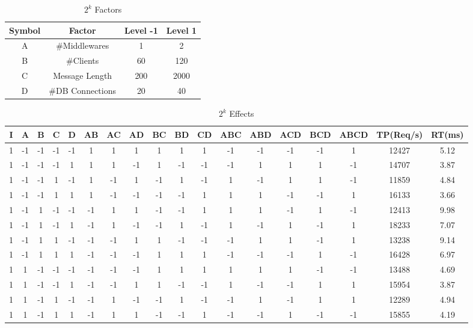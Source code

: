 \documentclass[11pt]{article}
\begin{document}
\begin{landscape}
\begin{table}
\small
\centering
\caption{$2^k$ Factors}
\label{tbl:2k_labels}
\begin{tabular}{cccc}
	Symbol & Factor & Level -1 & Level 1 \\ \hline
	A & \#Middlewares & 1 & 2 \\
	B & \#Clients & 60 & 120 \\
	C & Message Length & 200 & 2000 \\
	D & \#DB Connections & 20 & 40 \\ \hline
\end{tabular}
\end{table}
\begin{table}[]
	\small
	\centering
	\caption{$2^k$ Effects}
	\label{tbl:2k}
	\begin{tabular}{|cccccccccccccccc|cc|}
		\hline
		I & A & B & C & D & AB & AC & AD & BC & BD & CD & ABC & ABD & ACD & BCD & ABCD & TP(Req/s) & RT(ms)\\ \hline
		1 & -1 & -1 & -1 & -1 & 1 & 1 & 1 & 1 & 1 & 1 & -1 & -1 & -1 & -1 & 1 & 12427 & 5.12\\
		1 & -1 & -1 & -1 & 1 & 1 & 1 & -1 & 1 & -1 & -1 & -1 & 1 & 1 & 1 & -1 & 14707 & 3.87 \\
		1 & -1 & -1 & 1 & -1 & 1 & -1 & 1 & -1 & 1 & -1 & 1 & -1 & 1 & 1 & -1 & 11859 & 4.84 \\
		1 & -1 & -1 & 1 & 1 & 1 & -1 & -1 & -1 & -1 & 1 & 1 & 1 & -1 & -1 & 1 & 16133 & 3.66 \\
		1 & -1 & 1 & -1 & -1 & -1 & 1 & 1 & -1 & -1 & 1 & 1 & 1 & -1 & 1 & -1 & 12413 & 9.98 \\
		1 & -1 & 1 & -1 & 1 & -1 & 1 & -1 & -1 & 1 & -1 & 1 & -1 & 1 & -1 & 1 & 18233 & 7.07 \\
		1 & -1 & 1 & 1 & -1 & -1 & -1 & 1 & 1 & -1 & -1 & -1 & 1 & 1 & -1 & 1 & 13238 & 9.14 \\
		1 & -1 & 1 & 1 & 1 & -1 & -1 & -1 & 1 & 1 & 1 & -1 & -1 & -1 & 1 & -1 & 16428 & 6.97 \\
		1 & 1 & -1 & -1 & -1 & -1 & -1 & -1 & 1 & 1 & 1 & 1 & 1 & 1 & -1 & -1 & 13488 & 4.69 \\
		1 & 1 & -1 & -1 & 1 & -1 & -1 & 1 & 1 & -1 & -1 & 1 & -1 & -1 & 1 & 1 & 15954 & 3.87 \\
		1 & 1 & -1 & 1 & -1 & -1 & 1 & -1 & -1 & 1 & -1 & -1 & 1 & -1 & 1 & 1 & 12289 & 4.94 \\
		1 & 1 & -1 & 1 & 1 & -1 & 1 & 1 & -1 & -1 & 1 & -1 & -1 & 1 & -1 & -1 & 15855 & 4.19 \\

\end{tabular}
\end{table}
\end{landscape}
\end{document}
